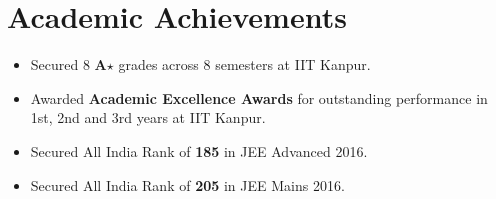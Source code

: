 \section*{Academic Achievements}
\begin{itemize}[itemsep=0mm]

\item Secured 8 \textbf{A$\star$} grades across 8 semesters at IIT Kanpur.
\item Awarded \textbf{Academic Excellence Awards} for outstanding performance in 1st, 2nd and 3rd years at IIT Kanpur.
\item Secured All India Rank of \textbf{185} in JEE Advanced 2016.
\item Secured All India Rank of \textbf{205} in JEE Mains 2016.

\end{itemize}
